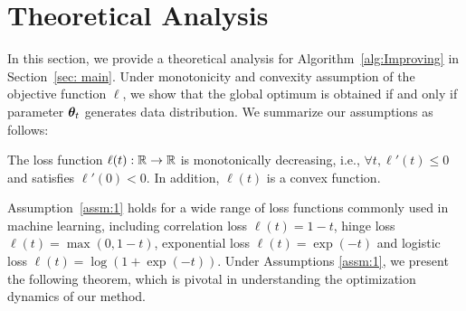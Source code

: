 \documentclass{article}
\begin{document}

























\section{Theoretical Analysis}\label{sec:thm}
In this section, we provide a theoretical analysis for Algorithm~\ref{alg:Improving} in Section~\ref{sec: main}.
Under monotonicity and convexity assumption of the objective function $\ell$, we show that the global optimum is obtained if and only if parameter $\bm{\theta}_t$ generates data distribution.
We summarize our assumptions as follows:


\begin{assumption} \label{assm:1}
The loss function $\ell(t): \mathbb{R} \rightarrow \mathbb{R}$ is monotonically decreasing, i.e., $\forall t, \ell'(t) \leq 0$ and satisfies $\ell'(0) < 0$. In addition, $\ell(t)$ is a convex function.
\end{assumption}

Assumption~\ref{assm:1} holds for a wide range of loss functions commonly used in machine learning, including correlation loss $\ell(t) = 1 - t$, hinge loss $\ell(t) = \max(0,1 - t)$, exponential loss $\ell(t) = \exp(-t)$ and logistic loss $\ell(t) = \log(1 + \exp(-t))$. Under Assumptions \ref{assm:1}, we present the following theorem, which is pivotal in understanding the optimization dynamics of our method.
\end{document}
